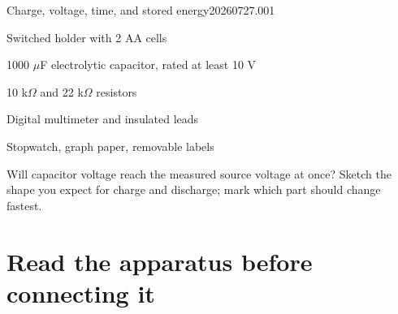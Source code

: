 

  {Charge, voltage, time, and stored energy}{20260727.001}

\newcommand{\checkoff}{\raisebox{.12ex}{\fbox{\rule{0pt}{.72ex}\rule{.72ex}{0pt}}}}
\newcommand{\blankline}{\rule{.94\linewidth}{.3pt}}
\newcommand{\capcircuit}[1]{%
\begin{tikzpicture}[x=.76cm,y=.76cm,line cap=round,line join=round,
  wire/.style={line width=.8pt},note/.style={font=\scriptsize}]
  \draw[wire] (0,0)--(0,1.6)--(.42,1.6);
  \draw[wire] (.42,1.32)--(.42,1.88);
  \draw[wire] (.66,1.40)--(.66,1.80);
  \node[note,below] at (.54,1.30){3 V};
  \draw[wire] (.66,1.6)--(1.28,1.6);
  \fill (1.32,1.6) circle (.045);
  \fill (2.08,1.6) circle (.045);
  \draw[line width=.9pt] (1.35,1.63)--(1.92,1.93);
  \node[note,above] at (1.69,1.92){S};
  \draw[wire] (2.08,1.6)--(2.32,1.6);
  \draw[wire,decorate,decoration={zigzag,segment length=2.1mm,amplitude=1.05mm}]
    (2.32,1.6)--(3.58,1.6);
  \node[note,above] at (2.95,1.76){10 k\(\Omega\)};
  \draw[wire] (3.58,1.6)--(4.08,1.6)--(4.08,1.12);
  \draw[wire] (3.72,1.12)--(4.44,1.12);
  \draw[wire] (3.72,.88)--(4.44,.88);
  \node[note] at (4.57,1.12){\( + \)};
  \node[note] at (4.57,.88){\( - \)};
  \node[note,right] at (4.42,.50){1000 \(\mu\)F};
  \draw[wire] (4.08,.88)--(4.08,0)--(0,0);
  #1
\end{tikzpicture}}


\rolecard

\begin{materials}
\item Switched holder with 2 AA cells
\item 1000 \(\mu\)F electrolytic capacitor, rated at least 10 V
\item 10 k\(\Omega\) and 22 k\(\Omega\) resistors
\item Digital multimeter and insulated leads
\item Stopwatch, graph paper, removable labels
\end{materials}

\begin{predict}
Will capacitor voltage reach the measured source voltage at once? Sketch the
shape you expect for charge and discharge; mark which part should change
fastest.
\end{predict}

\section{Read the apparatus before connecting it}

